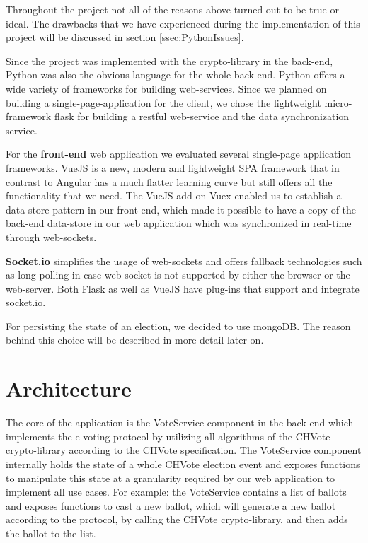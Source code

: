 Throughout the project not all of the reasons above turned out to be true or ideal. The drawbacks that we have experienced during the implementation of this project will be discussed in section \ref{ssec:PythonIssues}.

Since the project was implemented with the crypto-library in the back-end, Python was also the obvious language for the whole back-end. Python offers a wide variety of frameworks for building web-services. Since we planned on building a single-page-application for the client, we chose the lightweight micro-framework flask for building a restful web-service and the data synchronization service.

For the \textbf{front-end} web application we evaluated several single-page application frameworks. VueJS is a new, modern and lightweight SPA framework that in contrast to Angular has a much flatter learning curve but still offers all the functionality that we need. The VueJS add-on Vuex enabled us to establish a data-store pattern in our front-end, which made it possible to have a copy of the back-end data-store in our web application which was synchronized in real-time through web-sockets.

\textbf{Socket.io} simplifies the usage of web-sockets and offers fallback technologies such as long-polling in case web-socket is not supported by either the browser or the web-server. Both Flask as well as VueJS have plug-ins that support and integrate socket.io.

For persisting the state of an election, we decided to use mongoDB. The reason behind this choice will be described in more detail later on.

\section{Architecture}
The core of the application is the VoteService component in the back-end which implements the e-voting protocol by utilizing all algorithms of the CHVote crypto-library according to the CHVote specification. The VoteService component internally holds the state of a whole CHVote election event and exposes functions to manipulate this state at a granularity required by our web application to implement all use cases. For example: the VoteService contains a list of ballots and exposes functions to cast a new ballot, which will generate a new ballot according to the protocol, by calling the CHVote crypto-library, and then adds the ballot to the list.

